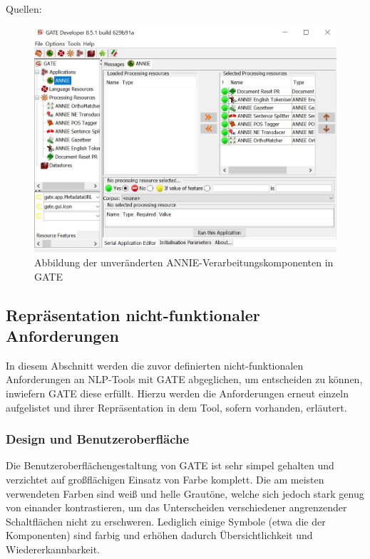\documentclass[12pt]{report}
\begin{document}
\cite{gm18}
Quellen:

\begin{center}
\begin{figure}[h!]
\includegraphics[scale=0.8]{GATE_Bilder/ANNIE2.jpg}
\caption{Abbildung der unveränderten ANNIE-Verarbeitungskomponenten in GATE}
\end{figure}
\end{center}

\subsection{Repräsentation nicht-funktionaler Anforderungen}
In diesem Abschnitt werden die zuvor definierten nicht-funktionalen Anforderungen an NLP-Tools mit GATE abgeglichen, um entscheiden zu können, inwiefern GATE diese erfüllt. Hierzu werden die Anforderungen erneut einzeln aufgelistet und ihrer Repräsentation in dem Tool, sofern vorhanden, erläutert. 

\subsubsection{Design und Benutzeroberfläche}

Die Benutzeroberflächengestaltung von GATE ist sehr simpel gehalten und verzichtet auf großflächigen Einsatz von Farbe komplett. Die am meisten verwendeten Farben sind weiß und helle Grautöne, welche sich jedoch stark genug von einander kontrastieren, um das Unterscheiden verschiedener angrenzender Schaltflächen nicht zu erschweren. Lediglich einige Symbole (etwa die der Komponenten) sind farbig und erhöhen dadurch Übersichtlichkeit und Wiedererkannbarkeit. 
\end{document}
